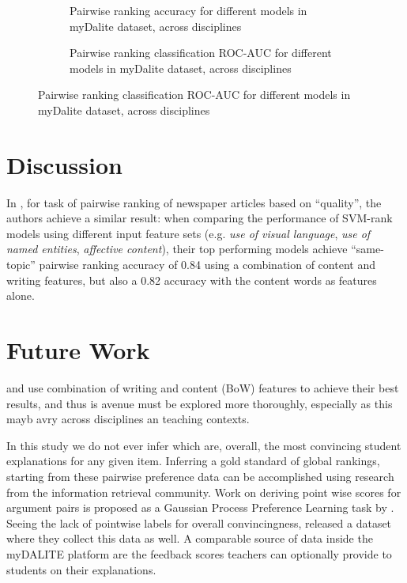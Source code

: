 \documentclass[runningheads]{llncs}
\begin{document}
\begin{figure}
	\begin{subfigure}[t]{0.5\linewidth}
		\centering
		\scalebox{0.5}{}
		
		\caption{Pairwise ranking accuracy for different models in myDalite 
		dataset, across disciplines}
	\end{subfigure}%
	\qquad
	\begin{subfigure}[t]{0.5\linewidth}
		\centering
		\scalebox{0.5}{}
		
		\caption{Pairwise ranking classification ROC-AUC for different models 
		in myDalite dataset, across disciplines}
	\end{subfigure}
\end{figure}

\section{Discussion}

In \cite{louis_what_2013}, for task of pairwise ranking of newspaper articles 
based on ``quality'', the authors achieve a similar result: when comparing the 
performance of SVM-rank models using different input feature sets (e.g. 
\textit{use of visual language}, \textit{use of named entities}, 
\textit{affective content}), their top performing models achieve ``same-topic'' 
pairwise ranking accuracy of 0.84 using a combination of content and writing 
features, but also a 0.82 accuracy with the content words as features alone.


\section{Future Work}
\cite{nguyen_computational_2015} and \cite{louis_what_2013} use combination of 
writing and content (BoW) features to achieve their best results, and thus is 
avenue must be explored more thoroughly, especially as this mayb avry across 
disciplines an teaching contexts.

In this study we do not ever infer which are, overall, the most convincing 
student explanations for any given item. Inferring a gold standard of global 
rankings, starting from these pairwise preference data can be accomplished 
using research from the information retrieval 
community\cite{chen_pairwise_2013}. Work on deriving point wise scores for 
argument pairs is proposed as a Gaussian Process Preference Learning task by 
\cite{simpson_finding_2018}. Seeing the lack of pointwise labels for overall 
convincingness, \cite{toledo_automatic_2019} released a dataset where they 
collect this data as well. A comparable source of data inside the myDALITE 
platform are the feedback scores teachers can optionally provide to students on 
their explanations.


 
 
\end{document}
